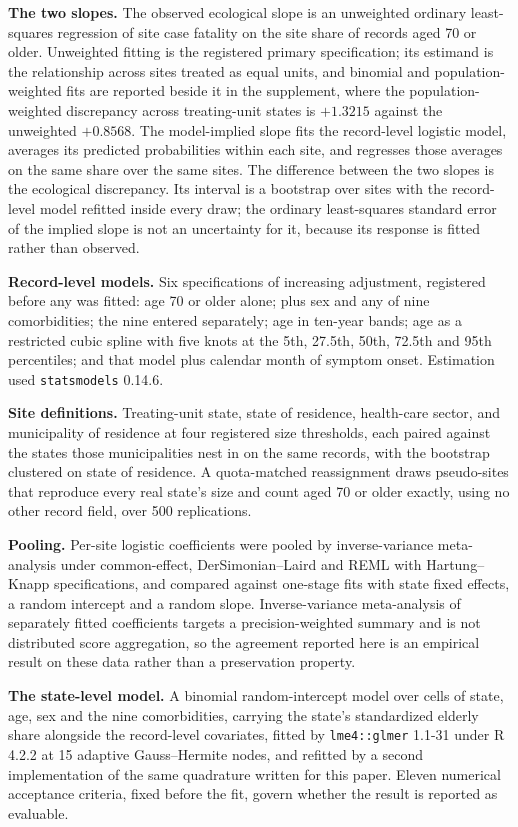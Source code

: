\documentclass[11pt]{article}
\begin{document}
\textbf{The two slopes.}  The observed ecological slope is an unweighted
ordinary least-squares regression of site case fatality on the site
share of records aged 70 or older.  Unweighted fitting is the
registered primary specification; its estimand is the relationship
across sites treated as equal units, and binomial and
population-weighted fits are reported beside it in the supplement, where
the population-weighted discrepancy across treating-unit states is
$+1.3215$ against the unweighted $+0.8568$.  The model-implied slope fits the record-level logistic
model, averages its predicted probabilities within each site, and
regresses those averages on the same share over the same sites.  The
difference between the two slopes is the ecological discrepancy.  Its
interval is a bootstrap over sites with the record-level model refitted
inside every draw; the ordinary least-squares standard error of the
implied slope is not an uncertainty for it, because its response is
fitted rather than observed.

\textbf{Record-level models.}  Six specifications of increasing
adjustment, registered before any was fitted: age 70 or older alone;
plus sex and any of nine comorbidities; the nine entered separately;
age in ten-year bands; age as a restricted cubic spline with five knots
at the 5th, 27.5th, 50th, 72.5th and 95th percentiles; and that model
plus calendar month of symptom onset.  Estimation used
\texttt{statsmodels} 0.14.6.

\textbf{Site definitions.}  Treating-unit state, state of residence,
health-care sector, and municipality of residence at four registered
size thresholds, each paired against the states those municipalities
nest in on the same records, with the bootstrap clustered on state of
residence.  A quota-matched reassignment draws pseudo-sites that
reproduce every real state's size and count aged 70 or older exactly,
using no other record field, over 500 replications.

\textbf{Pooling.}  Per-site logistic coefficients were pooled by
inverse-variance meta-analysis under common-effect, DerSimonian--Laird
and REML with Hartung--Knapp specifications, and compared against
one-stage fits with state fixed effects, a random intercept and a random
slope.  Inverse-variance meta-analysis of separately fitted coefficients
targets a precision-weighted summary and is not distributed score
aggregation, so the agreement reported here is an empirical result on
these data rather than a preservation property.

\textbf{The state-level model.}  A binomial random-intercept model over
cells of state, age, sex and the nine comorbidities, carrying the
state's standardized elderly share alongside the record-level
covariates, fitted by \texttt{lme4::glmer} 1.1-31 under R 4.2.2 at 15
adaptive Gauss--Hermite nodes, and refitted by a second implementation
of the same quadrature written for this paper.  Eleven numerical acceptance criteria, fixed before the
fit, govern whether the result is reported as evaluable.
\end{document}

